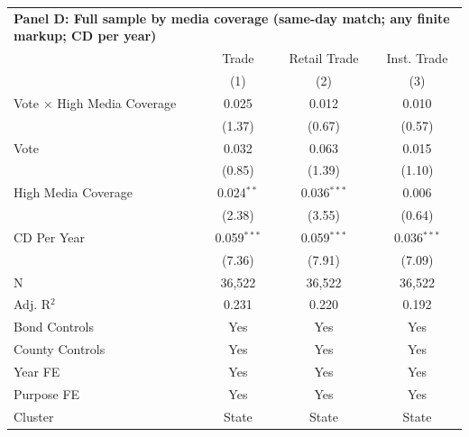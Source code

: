 \begingroup
\centering
\begin{tabular*}{\textwidth}{@{\extracolsep{\fill}}lccc}
\multicolumn{5}{l}{\textbf{Panel D: Full sample by media coverage (same-day match; any finite markup; CD per year)}}\\

\addlinespace
   \toprule
                                      & Trade         & Retail Trade  & Inst. Trade\\  
                                      & (1)           & (2)           & (3)\\  
   \midrule 
   Vote $\times$ High Media Coverage  & 0.025         & 0.012         & 0.010\\   
                                      & (1.37)       & (0.67)       & (0.57)\\   
   Vote                               & 0.032         & 0.063         & 0.015\\   
                                      & (0.85)       & (1.39)       & (1.10)\\   
   High Media Coverage                & 0.024$^{**}$  & 0.036$^{***}$ & 0.006\\   
                                      & (2.38)       & (3.55)       & (0.64)\\   
   CD Per Year                        & 0.059$^{***}$ & 0.059$^{***}$ & 0.036$^{***}$\\   
                                      & (7.36)       & (7.91)       & (7.09)\\   
   \hline
   N                       & 36,522        & 36,522        & 36,522\\  
   Adj. R$^2$                     & 0.231         & 0.220         & 0.192\\  
   Bond Controls                      & Yes           & Yes           & Yes\\  
   County Controls                    & Yes           & Yes           & Yes\\  
   Year FE                            & Yes           & Yes           & Yes\\  
   Purpose FE                         & Yes           & Yes           & Yes\\  
   Cluster              & State & State & State\\  
   \bottomrule
\end{tabular*}
\par\endgroup
